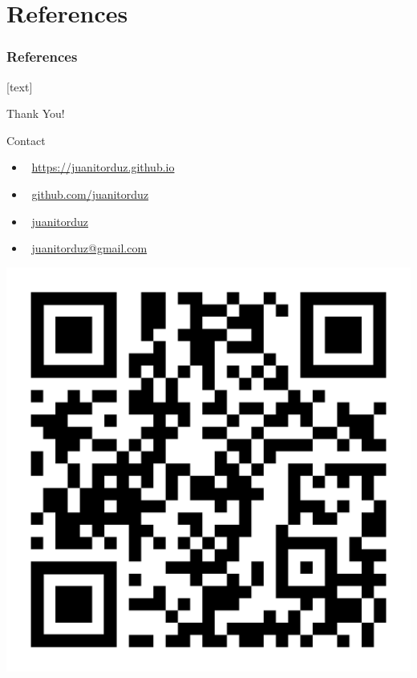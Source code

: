 \documentclass[10pt]{beamer}
\begin{document}
\section{References}

\begin{frame}[t, allowframebreaks]
\frametitle{References}
\footnotesize{
[text]

 
}
\end{frame}

\begin{frame}
\begin{center}
\huge{Thank You!}
\end{center}

\begin{block}{Contact}
\begin{itemize}
\item \faRocket $\:$ \href{https://juanitorduz.github.io}{https://juanitorduz.github.io}
\item \faGithub $\:$ \href{https://github.com/juanitorduz}{github.com/juanitorduz}
\item \faTwitter $\:$ \href{https://twitter.com/juanitorduz}{juanitorduz}
\item \faEnvelope $\:$ \href{mailto:juanitorduz@gmail.com}{juanitorduz@gmail.com}
\end{itemize}
\end{block}
\begin{center}
\includegraphics[scale=0.08]{images/qr-code-juanitorduz.png} 
\end{center}
\end{frame}
\end{document}
